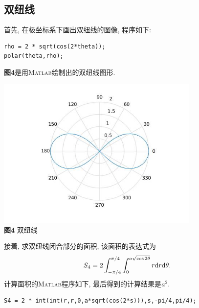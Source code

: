 \documentclass[a4paper,12pt]{article}
\begin{document}
\begin{CJK*}{UTF8}{gbsn}
\section{双纽线}
首先, 在极坐标系下画出双纽线的图像, 程序如下:\vspace{-15pt}
\begin{lstlisting}
rho = 2 * sqrt(cos(2*theta));
polar(theta,rho);
\end{lstlisting}\par\vspace{10pt}
\textbf{图4}是用\textsc{Matlab}绘制出的双纽线图形.\vspace{-5pt}
\begin{center}
\includegraphics[width = 10cm]{lemniscate.jpg}\\
\vspace{-15pt}\textbf{图4} 双纽线\\
\end{center}\vspace{5pt}
接着, 求双纽线闭合部分的面积, 该面积的表达式为
\begin{equation*}
S_4=2\int_{-\pi/4}^{\pi/4}\int_{0}^{a\sqrt{\cos{2\theta}}}r{\rm d}r{\rm d}\theta.
\end{equation*}
计算面积的\textsc{Matlab}程序如下, 最后得到的计算结果是$a^2$.\vspace{-15pt}
\begin{lstlisting}
S4 = 2 * int(int(r,r,0,a*sqrt(cos(2*s))),s,-pi/4,pi/4);
\end{lstlisting}\par




\end{CJK*}
\end{document}
